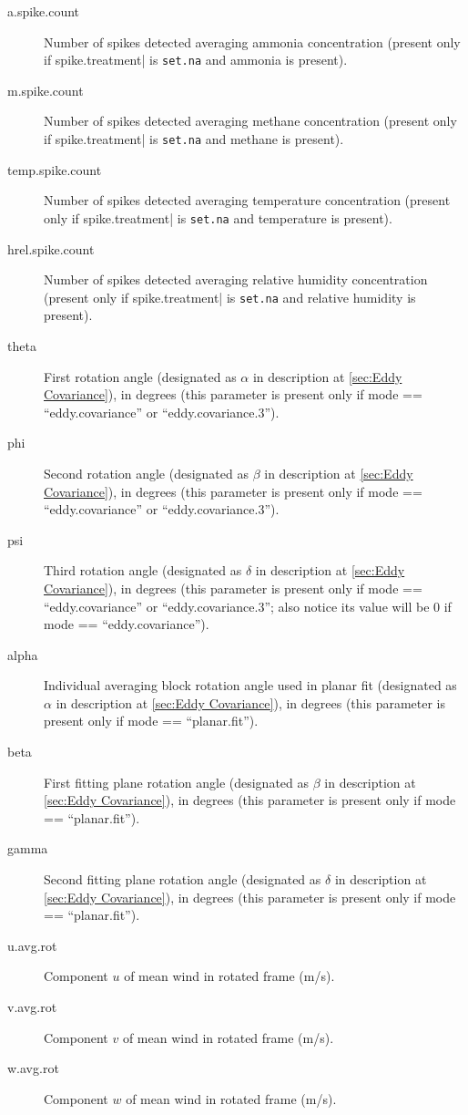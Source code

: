 \documentclass[a4paper,10pt]{book}
\begin{document}
\begin{description}
 \item[a.spike.count] Number of spikes detected averaging ammonia concentration (present only if \verb||spike.treatment| is \verb|set.na| and ammonia is present).
 \item[m.spike.count] Number of spikes detected averaging methane concentration (present only if \verb||spike.treatment| is \verb|set.na| and methane is present).
 \item[temp.spike.count] Number of spikes detected averaging temperature concentration (present only if \verb||spike.treatment| is \verb|set.na| and temperature is present).
 \item[hrel.spike.count] Number of spikes detected averaging relative humidity concentration (present only if \verb||spike.treatment| is \verb|set.na| and relative humidity is present).
 \item[theta] First rotation angle (designated as $\alpha$ in description at \ref{sec:Eddy Covariance}), in degrees (this parameter is present only if mode == ``eddy.covariance'' or ``eddy.covariance.3'').
 \item[phi] Second rotation angle (designated as $\beta$ in description at \ref{sec:Eddy Covariance}), in degrees (this parameter is present only if mode == ``eddy.covariance'' or ``eddy.covariance.3'').
 \item[psi] Third rotation angle (designated as $\delta$ in description at \ref{sec:Eddy Covariance}), in degrees (this parameter is present only if mode == ``eddy.covariance'' or ``eddy.covariance.3''; also notice its value will be 0 if mode == ``eddy.covariance'').
 \item[alpha] Individual averaging block rotation angle used in planar fit (designated as $\alpha$ in description at \ref{sec:Eddy Covariance}), in degrees (this parameter is present only if mode == ``planar.fit'').
 \item[beta] First fitting plane rotation angle (designated as $\beta$ in description at \ref{sec:Eddy Covariance}), in degrees (this parameter is present only if mode == ``planar.fit'').
 \item[gamma] Second fitting plane rotation angle (designated as $\delta$ in description at \ref{sec:Eddy Covariance}), in degrees (this parameter is present only if mode == ``planar.fit'').
 \item[u.avg.rot] Component $u$ of mean wind in rotated frame (m/s).
 \item[v.avg.rot] Component $v$ of mean wind in rotated frame (m/s).
 \item[w.avg.rot] Component $w$ of mean wind in rotated frame (m/s).

\end{description}
\end{document}
